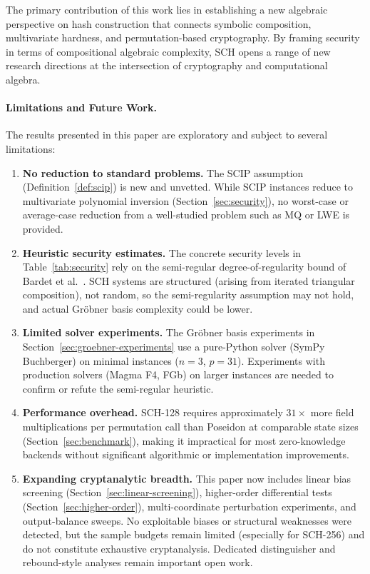﻿\documentclass[english]{aucmcs}
\begin{document}
The primary contribution of this work lies in establishing a new algebraic perspective on hash construction that connects symbolic composition, multivariate hardness, and permutation-based cryptography. By framing security in terms of compositional algebraic complexity, SCH opens a range of new research directions at the intersection of cryptography and computational algebra.

\paragraph{Limitations and Future Work.}
The results presented in this paper are exploratory and subject to several
limitations:
\begin{enumerate}
  \item \textbf{No reduction to standard problems.}  The SCIP assumption
    (Definition~\ref{def:scip}) is new and unvetted. While SCIP instances
    reduce to multivariate polynomial inversion (Section~\ref{sec:security}),
    no worst-case or average-case reduction from a well-studied problem
    such as MQ or LWE is provided.

  \item \textbf{Heuristic security estimates.}  The concrete security levels
    in Table~\ref{tab:security} rely on the semi-regular degree-of-regularity
    bound of Bardet et al.~\cite{Bardet2005}. SCH systems are structured
    (arising from iterated triangular composition), not random, so the
    semi-regularity assumption may not hold, and actual Gr\"obner basis
    complexity could be lower.

  \item \textbf{Limited solver experiments.}  The Gr\"obner basis experiments
    in Section~\ref{sec:groebner-experiments} use a pure-Python solver
    (SymPy Buchberger) on minimal instances ($n=3$, $p=31$). Experiments
    with production solvers (Magma F4, FGb) on larger instances are needed
    to confirm or refute the semi-regular heuristic.

  \item \textbf{Performance overhead.}  SCH-128 requires approximately
    $31\times$ more field multiplications per permutation call than
    Poseidon at comparable state sizes (Section~\ref{sec:benchmark}),
    making it impractical for most zero-knowledge backends without
    significant algorithmic or implementation improvements.

  \item \textbf{Expanding cryptanalytic breadth.}  This paper now includes
    linear bias screening (Section~\ref{sec:linear-screening}),
    higher-order differential tests (Section~\ref{sec:higher-order}),
    multi-coordinate perturbation experiments, and output-balance sweeps.
    No exploitable biases or structural weaknesses were detected, but the
    sample budgets remain limited (especially for SCH-256) and do not
    constitute exhaustive cryptanalysis. Dedicated distinguisher and
    rebound-style analyses remain important open work.
\end{enumerate}
\end{document}
